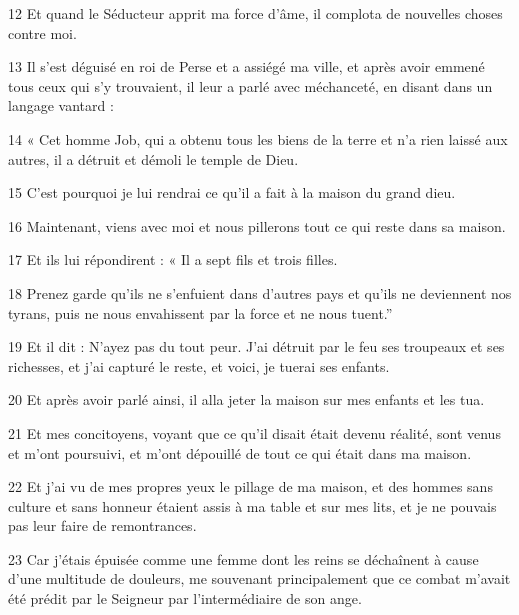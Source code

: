 \par 12 Et quand le Séducteur apprit ma force d'âme, il complota de nouvelles choses contre moi.

\par 13 Il s'est déguisé en roi de Perse et a assiégé ma ville, et après avoir emmené tous ceux qui s'y trouvaient, il leur a parlé avec méchanceté, en disant dans un langage vantard :

\par 14 « Cet homme Job, qui a obtenu tous les biens de la terre et n'a rien laissé aux autres, il a détruit et démoli le temple de Dieu.

\par 15 C'est pourquoi je lui rendrai ce qu'il a fait à la maison du grand dieu.

\par 16 Maintenant, viens avec moi et nous pillerons tout ce qui reste dans sa maison.

\par 17 Et ils lui répondirent : « Il a sept fils et trois filles.

\par 18 Prenez garde qu'ils ne s'enfuient dans d'autres pays et qu'ils ne deviennent nos tyrans, puis ne nous envahissent par la force et ne nous tuent.''

\par 19 Et il dit : N'ayez pas du tout peur. J'ai détruit par le feu ses troupeaux et ses richesses, et j'ai capturé le reste, et voici, je tuerai ses enfants.

\par 20 Et après avoir parlé ainsi, il alla jeter la maison sur mes enfants et les tua.

\par 21 Et mes concitoyens, voyant que ce qu'il disait était devenu réalité, sont venus et m'ont poursuivi, et m'ont dépouillé de tout ce qui était dans ma maison.

\par 22 Et j'ai vu de mes propres yeux le pillage de ma maison, et des hommes sans culture et sans honneur étaient assis à ma table et sur mes lits, et je ne pouvais pas leur faire de remontrances.

\par 23 Car j'étais épuisée comme une femme dont les reins se déchaînent à cause d'une multitude de douleurs, me souvenant principalement que ce combat m'avait été prédit par le Seigneur par l'intermédiaire de son ange.

